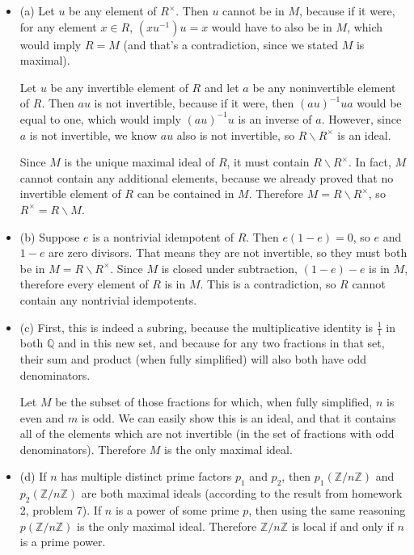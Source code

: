 \documentclass[12pt]{article}
\begin{document}
\begin{itemize}
    \item (a) Let $u$ be any element of $R^\times$. Then $u$ cannot be in $M$, because if it were, for any element $x \in R$, $(xu^{-1})u=x$ would have to also be in $M$, which would imply $R=M$ (and that's a contradiction, since we stated $M$ is maximal).
        \par
        Let $u$ be any invertible element of $R$ and let $a$ be any noninvertible element of $R$. Then $au$ is not invertible, because if it were, then $(au)^{-1}ua$ would be equal to one, which would imply $(au)^{-1}u$ is an inverse of $a$. However, since $a$ is not invertible, we know $au$ also is not invertible, so $R \backslash R^\times$ is an ideal.
        \par
        Since $M$ is the unique maximal ideal of $R$, it must contain $R \backslash R^\times$. In fact, $M$ cannot contain any additional elements, because we already proved that no invertible element of $R$ can be contained in $M$. Therefore $M = R \backslash R^\times$, so $R^\times = R \backslash M$.
    \item (b) Suppose $e$ is a nontrivial idempotent of $R$. Then $e(1-e)=0$, so $e$ and $1-e$ are zero divisors. That means they are not invertible, so they must both be in $M = R \backslash R^\times$. Since $M$ is closed under subtraction, $(1-e)-e$ is in $M$, therefore every element of $R$ is in $M$. This is a contradiction, so $R$ cannot contain any nontrivial idempotents.
    \item (c) First, this is indeed a subring, because the multiplicative identity is $\frac{1}{1}$ in both $\mathbb{Q}$ and in this new set, and because for any two fractions in that set, their sum and product (when fully simplified) will also both have odd denominators.
        \par
        Let $M$ be the subset of those fractions for which, when fully simplified, $n$ is even and $m$ is odd. We can easily show this is an ideal, and that it contains all of the elements which are not invertible (in the set of fractions with odd denominators). Therefore $M$ is the only maximal ideal.
    \item (d) If $n$ has multiple distinct prime factors $p_1$ and $p_2$, then $p_1 (\mathbb{Z}/n\mathbb{Z})$ and $p_2 (\mathbb{Z}/n\mathbb{Z})$ are both maximal ideals (according to the result from homework 2, problem 7). If $n$ is a power of some prime $p$, then using the same reasoning $p (\mathbb{Z}/n\mathbb{Z})$ is the only maximal ideal. Therefore $\mathbb{Z}/n\mathbb{Z}$ is local if and only if $n$ is a prime power.
\end{itemize}
\end{document}
